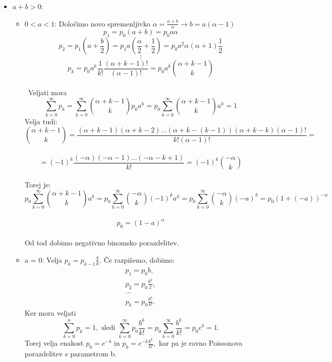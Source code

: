 \documentclass[a4paper]{article}
\begin{document}
\begin{enumerate}
\begin{itemize}
	\item \textbf{$a+b>0$}: 
	\begin{itemize}
		\item $0<a<1$:  Določimo novo spremenljivko $\alpha=\frac{a+b}{a}\rightarrow b=a(\alpha-1)$ \\ $$p_1=p_0(a+b)=p_0 a \alpha$$  $$p_2=p_1(a+\frac{b}{2})=p_1a(\frac{\alpha}{2}+\frac{1}{2})=p_0a^2\alpha(\alpha + 1) \frac{1}{2}$$  $$\vdots$$  $$p_k=p_0a^k\frac{1}{k!}\frac{(\alpha+k-1)!}{(\alpha-1)!}=p_0 a^k \binom{\alpha+k-1}{k}$$ \\\ {Veljati mora $$\sum_{k=0}^{\infty}p_k=\sum_{k=0}^{\infty}\binom{\alpha+k-1}{k}p_0a^k=p_0\sum_{k=0}^{\infty}\binom{\alpha+k-1}{k}a^k=1$$ Velja tudi: \\ $$\binom{\alpha+k-1}{k}=\frac{(\alpha+k-1)(\alpha+k-2)\ldots(\alpha+k-(k-1))(\alpha+k-k)(\alpha-1)!}{k!(\alpha-1)!}=$$ \\ $$=(-1)^k\frac{(-\alpha)(-\alpha-1)\ldots(-\alpha-k+1)}{k!}=(-1)^k\binom{-\alpha}{k}$$ \\ Torej je: \\ $$p_0\sum_{k=0}^{\infty}\binom{\alpha+k-1}{k}a^k=p_0\sum_{k=0}^{\infty}\binom{-\alpha}{k}(-1)^ka^k=p_0\sum_{k=0}^{\infty}\binom{-\alpha}{k}(-a)^k=p_0(1+(-a))^{-\alpha}$$ \\ $$p_0=(1-a)^{\alpha}$$ \\ Od tod dobimo negativno binomsko porazdelitev.}


		\item a = 0: Velja $p_k = p_{k-1} \frac{b}{k}$. Če razpišemo, dobimo:
		$$ \begin{array}{c}
		p_1 = p_0 b, \\[1.5mm]
		p_2 = p_0 \frac{b^2}{2}, \\[1.5mm]
		\ldots \\[1.5mm]
		p_k = p_0 \frac{b^k}{k!}.
		\end{array} $$
		Ker mora veljati \\
$$
		\sum_{k=0}^{n} p_k = 1, \text{ sledi }  \sum_{k=0}^{\infty} p_0 \frac{b^k}{k!} = p_0 \sum_{k=0}^{\infty} \frac{b^k}{k!} = p_0 e^b = 1.$$ Torej velja enakost $p_0 = e^{-b} \text{ in } p_k = e^{-b} \frac{b^k}{k!},$ kar pa je ravno Poissonova porazdelitev s parametrom b.


\end{itemize}
\end{itemize}
\end{enumerate}
\end{document}
